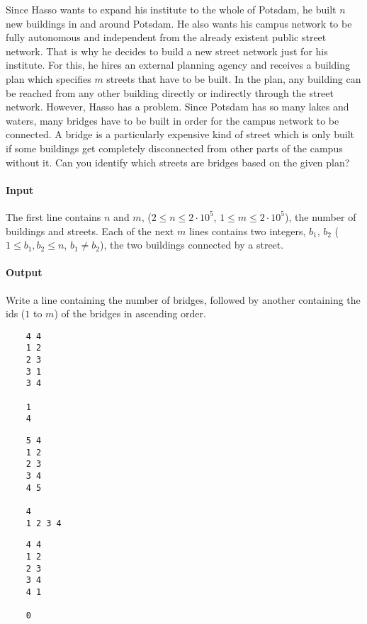 



\makeheader

Since Hasso wants to expand his institute to the whole of Potsdam, he built $n$ new buildings in and around Potsdam. He also wants his campus network to be fully autonomous and independent from the already existent public street network. That is why he decides to build a new street network just for his institute. For this, he hires an external planning agency and receives a building plan which specifies $m$ streets that have to be built. In the plan, any building can be reached from any other building directly or indirectly through the street network. 
However, Hasso has a problem. Since Potsdam has so many lakes and waters, many bridges have to be built in order for the campus network to be connected. A bridge is a particularly expensive kind of street which is only built if some buildings get completely disconnected from other parts of the campus without it.
Can you identify which streets are bridges based on the given plan? 

\paragraph*{Input}

The first line contains $n$ and $m$, ($2 \leq n \leq 2\cdot 10^5$, $1 \leq m \leq 2 \cdot 10^5$), the number of buildings and streets. 
Each of the next $m$ lines contains two integers, $b_1$, $b_2$ ($1 \leq b_1,b_2\leq n$, $b_1 \neq b_2$), the two buildings connected by a street.

\paragraph*{Output}

Write a line containing the number of bridges, followed by another
containing the ids ($1$ to $m$) of the bridges in ascending order.

\begin{samples}
  \begin{verbatim}
    4 4
    1 2
    2 3
    3 1
    3 4
    
    1
    4
  \end{verbatim}
  \begin{verbatim}
    5 4
    1 2
    2 3
    3 4
    4 5
    
    4
    1 2 3 4
  \end{verbatim}
  \begin{verbatim}
    4 4
    1 2
    2 3
    3 4
    4 1
    
    0
    
  \end{verbatim}
\end{samples}

